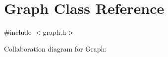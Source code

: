 \hypertarget{classGraph}{}\section{Graph Class Reference}
\label{classGraph}


{\ttfamily \#include $<$graph.\+h$>$}



Collaboration diagram for Graph\+:
